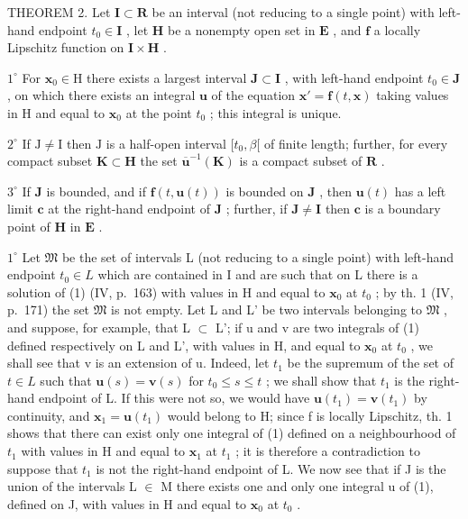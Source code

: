 THEOREM 2. Let \(\mathbf{I} \subset \mathbf{R}\) be an interval (not reducing to a single point) with left-hand endpoint \(t_0 \in \mathbf{I}\) , let \(\mathbf{H}\) be a nonempty open set in \(\mathbf{E}\) , and \(\mathbf{f}\) a locally Lipschitz function on \(\mathbf{I} \times \mathbf{H}\) .

\(1^{\circ}\) For \(\mathbf{x}_0\in \mathrm{H}\) there exists a largest interval \(\mathbf{J}\subset \mathbf{I}\) , with left-hand endpoint \(t_0\in \mathbf{J}\) , on which there exists an integral \(\mathbf{u}\) of the equation \(\mathbf{x}' = \mathbf{f}(t,\mathbf{x})\) taking values in H and equal to \(\mathbf{x}_0\) at the point \(t_0\) ; this integral is unique.

\(2^{\circ}\) If \(\mathrm{J} \neq \mathrm{I}\) then \(\mathrm{J}\) is a half-open interval \([t_0, \beta[\) of finite length; further, for every compact subset \(\mathbf{K} \subset \mathbf{H}\) the set \(\overline{\mathbf{u}}^{-1}(\mathbf{K})\) is a compact subset of \(\mathbf{R}\) .

\(3^{\circ}\) If \(\mathbf{J}\) is bounded, and if \(\mathbf{f}(t,\mathbf{u}(t))\) is bounded on \(\mathbf{J}\) , then \(\mathbf{u}(t)\) has a left limit \(\mathbf{c}\) at the right-hand endpoint of \(\mathbf{J}\) ; further, if \(\mathbf{J} \neq \mathbf{I}\) then \(\mathbf{c}\) is a boundary point of \(\mathbf{H}\) in \(\mathbf{E}\) .

\(1^{\circ}\) Let \(\mathfrak{M}\) be the set of intervals L (not reducing to a single point) with left-hand endpoint \(t_0 \in L\) which are contained in I and are such that on L there is a solution of (1) (IV, p.~163) with values in H and equal to \(\mathbf{x}_0\) at \(t_0\) ; by th. 1 (IV, p.~171) the set \(\mathfrak{M}\) is not empty. Let L and L' be two intervals belonging to \(\mathfrak{M}\) , and suppose, for example, that L \(\subset\) L'; if u and v are two integrals of (1) defined respectively on L and L', with values in H, and equal to \(\mathbf{x}_0\) at \(t_0\) , we shall see that v is an extension of u. Indeed, let \(t_1\) be the supremum of the set of \(t \in L\) such that \(\mathbf{u}(s) = \mathbf{v}(s)\) for \(t_0 \leqslant s \leqslant t\) ; we shall show that \(t_1\) is the right-hand endpoint of L. If this were not so, we would have \(\mathbf{u}(t_1) = \mathbf{v}(t_1)\) by continuity, and \(\mathbf{x}_1 = \mathbf{u}(t_1)\) would belong to H; since f is locally Lipschitz, th. 1 shows that there can exist only one integral of (1) defined on a neighbourhood of \(t_1\) with values in H and equal to \(\mathbf{x}_1\) at \(t_1\) ; it is therefore a contradiction to suppose that \(t_1\) is not the right-hand endpoint of L. We now see that if J is the union of the intervals L \(\in\) M there exists one and only one integral u of (1), defined on J, with values in H and equal to \(\mathbf{x}_0\) at \(t_0\) .

